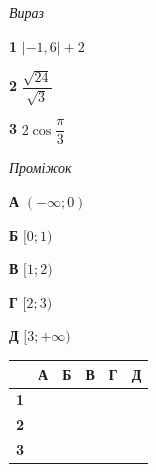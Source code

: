 \documentclass[14pt]{extarticle}
\newcommand{\matchTable}{
\begin{tabular}{|>{\centering\arraybackslash}p{0.3cm}|*{5}{>{\centering\arraybackslash}p{0.3cm}|}}
\hline
& \textbf{А} & \textbf{Б} & \textbf{В} & \textbf{Г} & \textbf{Д} \\
\hline
\textbf{1} & \rule{0pt}{0.3cm} & & & & \\
\hline
\textbf{2} & \rule{0pt}{0.3cm} & & & & \\
\hline
\textbf{3} & \rule{0pt}{0.3cm} & & & & \\
\hline
\end{tabular}
}
\begin{document}
\vspace{0.3cm}
\begin{minipage}{0.35\textwidth}
\textit{Вираз}

\vspace{0.2cm}
\textbf{1} \quad $|-1{,}6| + 2$

\vspace{0.3cm}
\textbf{2} \quad $\dfrac{\sqrt{24}}{\sqrt{3}}$

\vspace{0.3cm}
\textbf{3} \quad $2\cos\dfrac{\pi}{3}$
\end{minipage}
\hfill
\begin{minipage}{0.3\textwidth}
\textit{Проміжок}

\vspace{0.2cm}
\textbf{А} \quad $(-\infty; 0)$

\vspace{0.2cm}
\textbf{Б} \quad $[0; 1)$

\vspace{0.2cm}
\textbf{В} \quad $[1; 2)$

\vspace{0.2cm}
\textbf{Г} \quad $[2; 3)$

\vspace{0.2cm}
\textbf{Д} \quad $[3; +\infty)$
\end{minipage}
\hfill
\begin{minipage}{0.2\textwidth}
\matchTable
\end{minipage}

\vspace{0.7cm}
\end{document}
